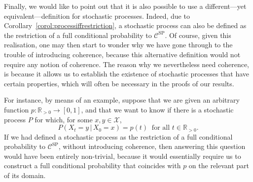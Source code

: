 \documentclass[10pt,a4paper]{paper}
\theoremstyle{definition}
\newcommand{\reals}{\mathbb{R}}
\newcommand{\realspos}{\reals_{>0}}
\newcommand{\states}{\mathcal{X}}
\begin{document}


Finally, we would like to point out that it is also possible to use a different---yet equivalent---definition for stochastic processes. Indeed, due to Corollary~\ref{corol:processiffrestriction}, a stochastic process can also be defined as the restriction of a full conditional probability to $\mathcal{C}^{\mathrm{SP}}$. Of course, given this realisation, one may then start to wonder why we have gone through to the trouble of introducing coherence, because this alternative definition would not require any notion of coherence. The reason why we nevertheless need coherence, is because it allows us to establish the existence of stochastic processes that have certain properties, which will often be necessary in the proofs of our results.

For instance, by means of an example, suppose that we are given an arbitrary function $p:\realspos\to [0,1]$, and that we want to know if there is a stochastic process $P$ for which, for some $x,y\in\states$,
\begin{equation}\label{eq:extendptoP}
P(X_t=y\,\vert\,X_0=x) = p(t)
~\text{ for all $t\in\realspos$.}
\end{equation}
If we had defined a stochastic process as the restriction of a full conditional probability to $\mathcal{C}^\mathrm{SP}$, without introducing coherence, then answering this question would have been entirely non-trivial, because it would essentially require us to construct a full conditional probability that coincides with $p$ on the relevant part of its domain.
\end{document}
